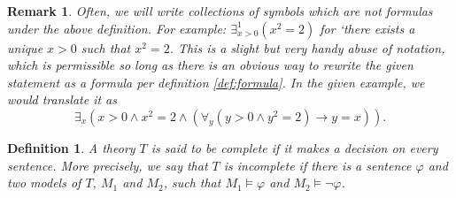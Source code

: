 \documentclass{article}
\newtheorem{remark}[theorem]{Remark}
\newtheorem{definition}[theorem]{Definition}
\theoremstyle{nonumberplain}
\begin{document}
\begin{remark}
Often, we will write collections of symbols which are not formulas under the above definition. For example: $\exists^1_{x>0} (x^2 = 2)$ for `there exists a unique $x>0$ such that $x^2 = 2$. This is a slight but very handy abuse of notation, which is permissible so long as there is an obvious way to rewrite the given statement as a formula per definition \ref{def:formula}. In the given example, we would translate it as 
\begin{equation}
\exists_x (x > 0 \land x^2 = 2 \land (\forall_y (y > 0 \land y^2 = 2) \rightarrow y=x)).
\end{equation}
\end{remark}

\begin{definition}
A theory $T$ is said to be \emph{complete} if it makes a decision on every sentence. More precisely, we say that $T$ is \emph{incomplete} if there is a sentence $\varphi$ and two models of $T$, $M_1$ and $M_2$, such that $M_1 \vDash \varphi$ and $M_2 \vDash \neg\varphi$.
\end{definition}



\end{document}

